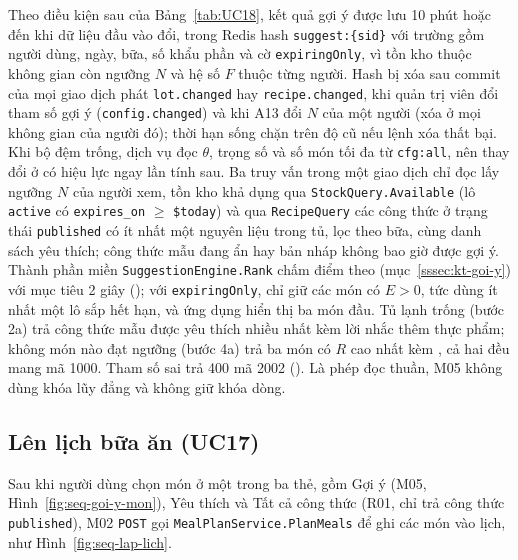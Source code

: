 
Theo điều kiện sau của Bảng~\ref{tab:UC18}, kết quả gợi ý được lưu 10 phút hoặc đến khi dữ liệu đầu vào đổi, trong Redis hash \texttt{suggest:\{sid\}} với trường gồm người dùng, ngày, bữa, số khẩu phần và cờ \texttt{expiringOnly}, vì tồn kho thuộc không gian còn ngưỡng $N$ và hệ số $F$ thuộc từng người. Hash bị xóa sau commit của mọi giao dịch phát \texttt{lot.changed} hay \texttt{recipe.changed}, khi quản trị viên đổi tham số gợi ý (\texttt{config.changed}) và khi A13 đổi $N$ của một người (xóa ở mọi không gian của người đó); thời hạn sống chặn trên độ cũ nếu lệnh xóa thất bại. Khi bộ đệm trống, dịch vụ đọc $\theta$, trọng số và số món tối đa từ \texttt{cfg:all}, nên thay đổi ở  có hiệu lực ngay lần tính sau. Ba truy vấn trong một giao dịch chỉ đọc lấy ngưỡng $N$ của người xem, tồn kho khả dụng qua \texttt{StockQuery.Available} (lô \texttt{active} có \texttt{expires\_on} $\ge$ \texttt{\$today}) và qua \texttt{RecipeQuery} các công thức ở trạng thái \texttt{published} có ít nhất một nguyên liệu trong tủ, lọc theo bữa, cùng danh sách yêu thích; công thức mẫu đang ẩn hay bản nháp không bao giờ được gợi ý. Thành phần miền \texttt{SuggestionEngine.Rank} chấm điểm theo  (mục~\ref{sssec:kt-goi-y}) với mục tiêu 2 giây (); với \texttt{expiringOnly}, chỉ giữ các món có $E > 0$, tức dùng ít nhất một lô sắp hết hạn, và ứng dụng hiển thị ba món đầu. Tủ lạnh trống (bước 2a) trả công thức mẫu được yêu thích nhiều nhất kèm lời nhắc thêm thực phẩm; không món nào đạt ngưỡng (bước 4a) trả ba món có $R$ cao nhất kèm , cả hai đều mang mã 1000. Tham số sai trả 400 mã 2002 (). Là phép đọc thuần, M05 không dùng khóa lũy đẳng và không giữ khóa dòng.

\subsection{Lên lịch bữa ăn (UC17)}\label{sssec:ht-lap-lich}

Sau khi người dùng chọn món ở một trong ba thẻ, gồm Gợi ý (M05, Hình~\ref{fig:seq-goi-y-mon}), Yêu thích và Tất cả công thức (R01, chỉ trả công thức \texttt{published}), M02 \texttt{POST}  gọi \texttt{MealPlanService.PlanMeals} để ghi các món vào lịch, như Hình~\ref{fig:seq-lap-lich}.

